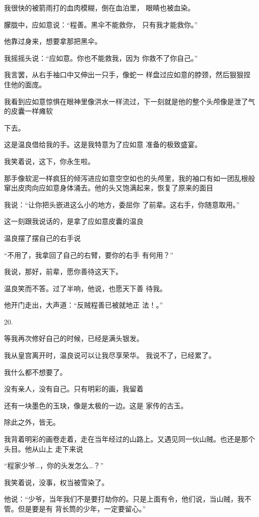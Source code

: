 \documentclass{article}
\begin{document}
我很快的被箭雨打的血肉模糊，倒在血泊里，
眼睛也被血染。 

朦胧中，应如意说：“程善。黑伞不能救你，
只有我才能救你。” 


他靠过身来，想要拿那把黑伞。 

我摇摇头说：“应如意。你也不能救我，因为
你救不了你自己。” 

我言罢，从右手袖口中又伸出一只手，像蛇一
样盘过应如意的脖颈，然后狠狠捏住他的面庞。 

我看到应如意惊惧在眼神里像洪水一样流过，下一刻就是他的整个头颅像是泄了气的皮囊一样瘫软

\newpage
下去。 

这是温良借给我的手。这是我特意为了应如意
准备的极致盛宴。 


我笑着说，这下，你永生啦。 

那手像软泥一样疯狂的倾泻进应如意空空如也的头颅里，我的袖口有如一团乱根般窜出皮肉向应如意身体涌去。他的头又饱满起来，恢复了原来的面目

我说：“让你把头嵌进这么小的地方，委屈你
了前辈。这右手，你随意取用。” 

这一刻跟我说话的，是拿了应如意皮囊的温良


温良摆了摆自己的右手说 

“不用了，我拿回了自己的右臂，要你的右手
有何用？” 


\newpage

我说，那好，前辈，愿你善待这天下。 

温良笑而不答。过了半响，他说，也愿天下善
待我。 

他开门走出，大声道：“反贼程善已被就地正
法！。” 


20. 

等我再次修好自己的时候，已经是满头银发。

我从皇宫离开时，温良说可以让我尽享荣华。
我说不了，已经累了。 


我什么都不想要了。 

没有亲人，没有自己。只有明彩的画，我留着

还有一块墨色的玉玦，像是太极的一边。这是
家传的古玉。 

\newpage


除此之外，皆无。 

我背着明彩的画卷走着，走在当年经过的山路上。又遇见同一伙山贼。也还是那个头目。他从山上
走下来说 


“程家少爷…，你的头发怎么…？” 


我笑着说，没事，权当被雪染了。 

他说：“少爷，当年我们不是要打劫你的。只是上面有令，他们说，当山贼，我不管。但是要是有
背长筒的少年，一定要留心。” 
\end{document}
